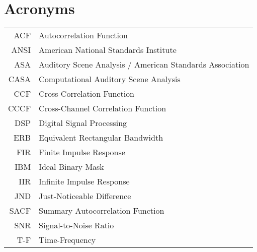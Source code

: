 \documentclass[english,bachelor,unicode]{ctufit-thesis}
\theoremstyle{plain}
\theoremstyle{definition}
\theoremstyle{remark}
\numberwithin{theorem}{chapter}
\begin{document}
	\printabstractpage
	
	
	\chapter{Acronyms} %
	\begin{tabular}{rl}
		ACF & Autocorrelation Function\\
		ANSI & American National Standards Institute\\
		ASA & Auditory Scene Analysis / American Standards Association\\
		CASA & Computational Auditory Scene Analysis\\
		CCF & Cross-Correlation Function\\
		CCCF & Cross-Channel Correlation Function\\
		DSP & Digital Signal Processing\\
		ERB & Equivalent Rectangular Bandwidth\\
		FIR & Finite Impulse Response\\
		IBM & Ideal Binary Mask\\
		IIR & Infinite Impulse Response\\
		JND & Just-Noticeable Difference\\
		SACF & Summary Autocorrelation Function\\
		SNR & Signal-to-Noise Ratio\\
		T-F & Time-Frequency
	\end{tabular}
	
\end{document}

